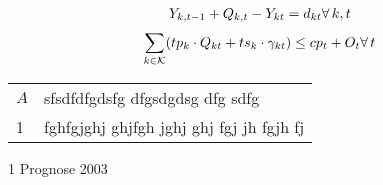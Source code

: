 \documentclass[a4paper,12pt,parskip,bibtotoc,liststotoc]{article}
\begin{document}
\begin{multline}
Y_{k,t-1}+Q_{k,t}-Y_{kt}=d_{kt} \hfill \forall\, k,t \label{Eq:LagBil}
\end{multline}\vspace{-3.0ex}
\begin{multline}
\sum_{k\in \mathcal{K}}(tp_k \cdot Q_{kt}+ts_k\cdot
\gamma_{kt})\leq cp_{t} + O_{t}\hfill  \forall\, t
\label{Eq:KapBed}
\end{multline}

\begin{threeparttable}
\begin{tabular}{|l|l|}
\hline
$A$ & sfsdfdfgdsfg dfgsdgdsg dfg sdfg  \\
1 & fghfgjghj ghjfgh jghj ghj fgj jh fgjh fj \tnote{1} \\
\hline
\end{tabular}
\begin{tablenotes}\footnotesize
\item[1] Prognose 2003
\end{tablenotes}
\end{threeparttable}
\end{document}
